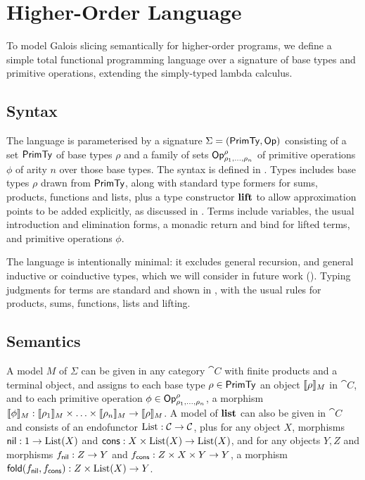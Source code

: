 \section{Higher-Order Language}
\label{sec:language}

To model Galois slicing semantically for higher-order programs, we define a simple total functional
programming language over a signature of base types and primitive operations, extending the simply-typed
lambda calculus.

\subsection{Syntax}
\label{sec:language:syntax}

The language is parameterised by a signature $\Sigma = (\mathsf{PrimTy}, \mathsf{Op})$ consisting of a set $\mathsf{PrimTy}$ of
base types $\rho$ and a family of sets $\mathsf{Op}^\rho_{\rho_1,\ldots,\rho_n}$ of primitive operations $\phi$ of
arity $n$ over those base types. The syntax is defined in . Types includes base types $\rho$
drawn from $\mathsf{PrimTy}$, along with standard type formers for sums, products, functions and lists, plus a type
constructor $\mathbf{lift}$ to allow approximation points to be added explicitly, as discussed in
. Terms include variables, the usual introduction and elimination forms, a monadic
return and bind for lifted terms, and primitive operations $\phi$.

The language is intentionally minimal: it excludes general recursion, and general inductive or coinductive
types, which we will consider in future work (). Typing judgments for terms are standard
and shown in , with the usual rules for products, sums, functions, lists and lifting.




\subsection{Semantics}
\label{sec:language:semantics}



A model $M$ of $\Sigma$ can be given in any category $\cat{C}$ with finite products and a terminal object, and
assigns to each base type $\rho \in \mathsf{PrimTy}$ an object $\llbracket \rho \rrbracket_{M}$ in $\cat{C}$, and to each primitive
operation $\phi \in \mathsf{Op}^\rho_{\rho_1,\ldots,\rho_n}$, a morphism $\llbracket \phi \rrbracket_{M}: \llbracket \rho_1 \rrbracket_{M} \times
\ldots \times \llbracket \rho_n \rrbracket_{M} \to \llbracket \rho \rrbracket_{M}$. A model of $\mathbf{list}$ can also be given in $\cat{C}$ and
consists of an endofunctor $\mathrm{List}: \mathcal{C} \to \mathcal{C}$, plus for any object $X$, morphisms $\mathsf{nil}: 1 \to
\mathrm{List}(X)$ and $\mathsf{cons}: X \times \mathrm{List}(X) \to \mathrm{List}(X)$, and for any objects $Y, Z$ and morphisms $f_{\mathsf{nil}}: Z \to
Y$ and $f_{\mathsf{cons}}: Z \times X \times Y \to Y$, a morphism $\mathsf{fold}(f_{\mathsf{nil}},f_{\mathsf{cons}}): Z \times \mathrm{List}(X) \to Y$.

